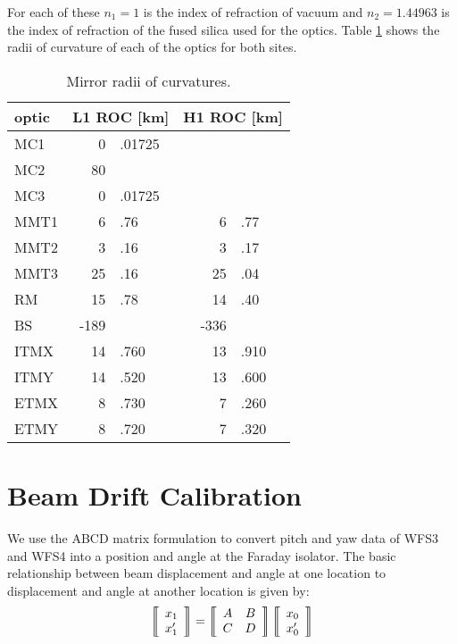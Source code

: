 For each of these $n_1 = 1$ is the index of refraction of vacuum and
$n_2 = 1.44963$ is the index of refraction of the fused silica used
for the optics. Table \ref{tab:ROCs} shows the radii of curvature of
each of the optics for both sites.

\begin{table}
\centering
\caption{Mirror radii of curvatures.} 
\begin{tabular}{l r@{}l r@{}l}
\hline
optic & \multicolumn{2}{l}{L1 ROC [km]} & \multicolumn{2}{l}{H1 ROC [km]} \\
\hline
MC1 & 0&.01725 & & \\
MC2 & 80&  & & \\ 
MC3 & 0&.01725 & & \\ 
MMT1 & 6&.76 & 6&.77 \\
MMT2 & 3&.16 & 3&.17 \\
MMT3 & 25&.16 & 25&.04\\
RM & 15&.78 & 14&.40 \\
BS & -189& & -336& \\
ITMX & 14&.760 & 13&.910 \\ 
ITMY & 14&.520 & 13&.600 \\
ETMX & 8&.730 & 7&.260 \\
ETMY & 8&.720 & 7&.320 \\
\hline
\end{tabular}
\label{tab:ROCs}
\end{table} 


\section{Beam Drift Calibration}
We use the ABCD matrix formulation to convert pitch and yaw data of
WFS3 and WFS4 into a position and angle at the Faraday isolator. The
basic relationship between beam displacement and angle at one location
to displacement and angle at another location is given by:
\begin{equation}
\left \llbracket \begin{array}{c} 
x_1 \\
x^{\prime}_1 \end{array} \right\rrbracket =
\left\llbracket \begin{array}{c c}
A & B \\
C & D \end{array} \right\rrbracket
\left \llbracket \begin{array}{c} 
x_0 \\
x^{\prime}_0 \end{array} \right\rrbracket
\label{eq:abcd}
\end{equation}

